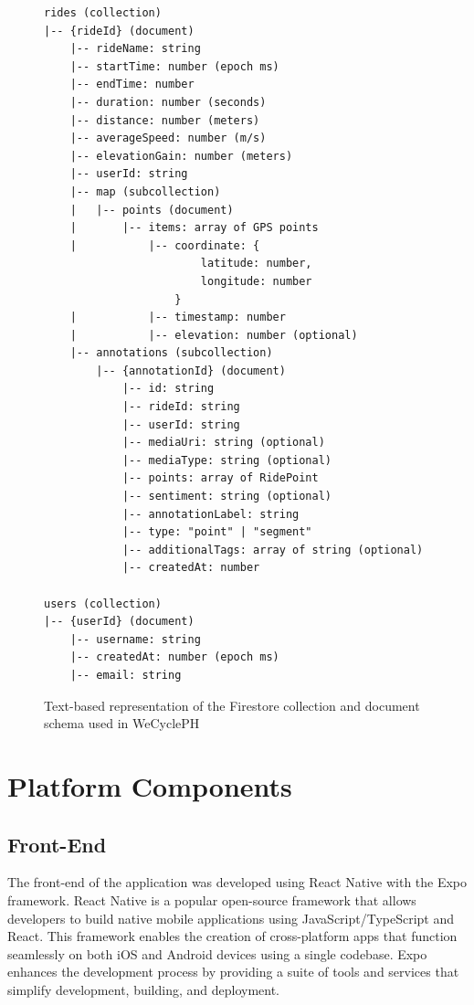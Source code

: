 \begin{figure}[H]
\centering
\begin{lstlisting}[basicstyle=\ttfamily\footnotesize, frame=single]
rides (collection)
|-- {rideId} (document)
    |-- rideName: string
    |-- startTime: number (epoch ms)
    |-- endTime: number
    |-- duration: number (seconds)
    |-- distance: number (meters)
    |-- averageSpeed: number (m/s)
    |-- elevationGain: number (meters)
    |-- userId: string
    |-- map (subcollection)
    |   |-- points (document)
    |       |-- items: array of GPS points
    |           |-- coordinate: { 
                        latitude: number, 
                        longitude: number 
                    }
    |           |-- timestamp: number
    |           |-- elevation: number (optional)
    |-- annotations (subcollection)
        |-- {annotationId} (document)
            |-- id: string
            |-- rideId: string
            |-- userId: string
            |-- mediaUri: string (optional)
            |-- mediaType: string (optional)
            |-- points: array of RidePoint
            |-- sentiment: string (optional)
            |-- annotationLabel: string
            |-- type: "point" | "segment"
            |-- additionalTags: array of string (optional)
            |-- createdAt: number

users (collection)
|-- {userId} (document)
    |-- username: string
    |-- createdAt: number (epoch ms)
    |-- email: string
\end{lstlisting}
\caption{Text-based representation of the Firestore collection and document schema used in WeCyclePH}
\label{fig:firestore_schema_text}
\end{figure}




\section{Platform Components}
\subsection{Front-End}
The front-end of the application was developed using React Native with the Expo framework. React Native is a popular open-source framework that allows developers to build native mobile applications using JavaScript/TypeScript and React. This framework enables the creation of cross-platform apps that function seamlessly on both iOS and Android devices using a single codebase. Expo enhances the development process by providing a suite of tools and services that simplify development, building, and deployment.

